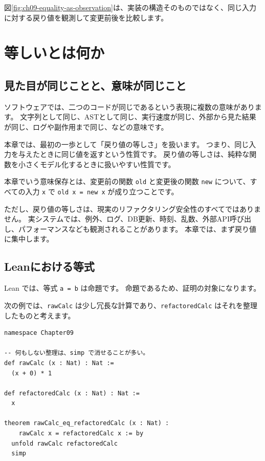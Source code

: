 図\ref{fig:ch09-equality-as-observation}は、実装の構造そのものではなく、同じ入力に対する戻り値を観測して変更前後を比較します。


\section{等しいとは何か}

\subsection{見た目が同じことと、意味が同じこと}

ソフトウェアでは、二つのコードが同じであるという表現に複数の意味があります。
文字列として同じ、ASTとして同じ、実行速度が同じ、外部から見た結果が同じ、ログや副作用まで同じ、などの意味です。

本章では、最初の一歩として「戻り値の等しさ」を扱います。
つまり、同じ入力を与えたときに同じ値を返すという性質です。
戻り値の等しさは、純粋な関数を小さくモデル化するときに扱いやすい性質です。

本章でいう意味保存とは、変更前の関数 \texttt{old} と変更後の関数 \texttt{new} について、すべての入力 \texttt{x} で \texttt{old x = new x} が成り立つことです。

ただし、戻り値の等しさは、現実のリファクタリング安全性のすべてではありません。
実システムでは、例外、ログ、DB更新、時刻、乱数、外部API呼び出し、パフォーマンスなども観測されることがあります。
本章では、まず戻り値に集中します。

\subsection{Leanにおける等式}

Lean では、等式 \texttt{a = b} は命題です。
命題であるため、証明の対象になります。

次の例では、\texttt{rawCalc} は少し冗長な計算であり、\texttt{refactoredCalc} はそれを整理したものと考えます。

\begin{listing}[htbp]
\begin{verbatim}
namespace Chapter09

-- 何もしない整理は、simp で消せることが多い。
def rawCalc (x : Nat) : Nat :=
  (x + 0) * 1

def refactoredCalc (x : Nat) : Nat :=
  x

theorem rawCalc_eq_refactoredCalc (x : Nat) :
    rawCalc x = refactoredCalc x := by
  unfold rawCalc refactoredCalc
  simp
\end{verbatim}
\caption{\texttt{rawCalc} と \texttt{refactoredCalc}}
\label{lst:ch09_raw_refactored}
\end{listing}

